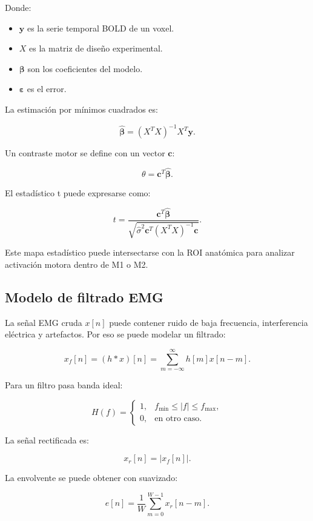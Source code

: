 \documentclass[12pt,a4paper]{article}
\begin{document}
Donde:

\begin{itemize}
    \item \(\mathbf{y}\) es la serie temporal BOLD de un voxel.
    \item \(X\) es la matriz de diseño experimental.
    \item \(\boldsymbol{\beta}\) son los coeficientes del modelo.
    \item \(\boldsymbol{\varepsilon}\) es el error.
\end{itemize}

La estimación por mínimos cuadrados es:

\[
\hat{\boldsymbol{\beta}}
=
(X^TX)^{-1}X^T\mathbf{y}.
\]

Un contraste motor se define con un vector \(\mathbf{c}\):

\[
\theta =
\mathbf{c}^T\hat{\boldsymbol{\beta}}.
\]

El estadístico t puede expresarse como:

\[
t =
\frac{
\mathbf{c}^T\hat{\boldsymbol{\beta}}
}
{
\sqrt{
\hat{\sigma}^2
\mathbf{c}^T
(X^TX)^{-1}
\mathbf{c}
}
}.
\]

Este mapa estadístico puede intersectarse con la ROI anatómica para analizar activación motora dentro de M1 o M2.

\subsection{Modelo de filtrado EMG}

La señal EMG cruda \(x[n]\) puede contener ruido de baja frecuencia, interferencia eléctrica y artefactos. Por eso se puede modelar un filtrado:

\[
x_f[n]
=
(h*x)[n]
=
\sum_{m=-\infty}^{\infty}
h[m]x[n-m].
\]

Para un filtro pasa banda ideal:

\[
H(f)=
\begin{cases}
1, & f_{\min}\leq |f|\leq f_{\max},\\
0, & \text{en otro caso}.
\end{cases}
\]

La señal rectificada es:

\[
x_r[n]=|x_f[n]|.
\]

La envolvente se puede obtener con suavizado:

\[
e[n]
=
\frac{1}{W}
\sum_{m=0}^{W-1}
x_r[n-m].
\]
\end{document}
